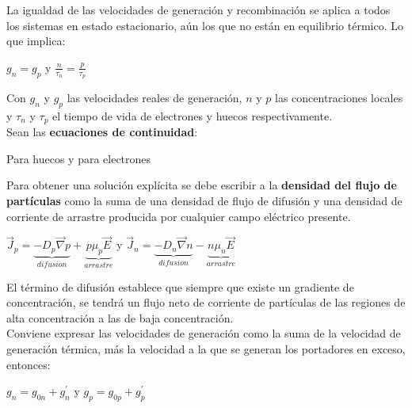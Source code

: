 \documentclass[oneside]{book}
\numberwithin{equation}{section}
\numberwithin{figure}{section}
\numberwithin{table}{section}
\begin{document}
			La igualdad de las velocidades de generación y recombinación se aplica a todos los sistemas en estado estacionario, aún los que no están en equilibrio térmico. Lo que implica:\\
			
			\begin{center}
				$g_n=g_p$ y $\displaystyle \frac{n}{\tau_n}=\frac{p}{\tau_p}$
			\end{center}
			
			Con $g_n$ y $g_p$ las velocidades reales de generación, $n$ y $p$ las concentraciones locales y $\tau_n$ y $\tau_p$ el tiempo de vida de electrones y huecos respectivamente.\\
			
			Sean las \textbf{ecuaciones de continuidad}:
			
			\begin{center}
				Para huecos  y para electrones 
			\end{center}	
			
			Para obtener una solución explícita se debe escribir a la \textbf{densidad del flujo de partículas} como la suma de una densidad de flujo de difusión y una densidad de corriente de arrastre producida por cualquier campo eléctrico presente.\\
			
			\begin{center}
				$\displaystyle \vec{J}_p=\underbrace{-D_p\vec{\nabla}p}_{difusion}+\underbrace{p\mu_p\vec{E}}_{arrastre}$ y
				$\displaystyle \vec{J}_n=\underbrace{-D_n\vec{\nabla}n}_{difusion}-\underbrace{n\mu_n\vec{E}}_{arrastre}$
			\end{center}
		
		El término de difusión establece que siempre que existe un gradiente de concentración, se tendrá un flujo neto de corriente de partículas de las regiones de alta concentración a las de baja concentración.\\
		
		Conviene expresar las velocidades de generación como la suma de la velocidad de generación térmica, más la velocidad a la que se generan los portadores en exceso, entonces:
		
		\begin{center}
			$g_n=g_{0n}+g_n^\prime$	 y $g_p=g_{0p}+g_p^\prime$	
		\end{center}
		
\end{document}
